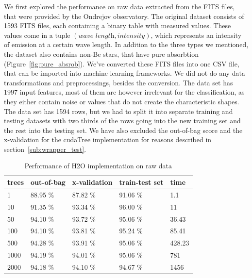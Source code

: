 \documentclass[thesis=B,english]{FITthesis}[2012/10/20]
\begin{document}
We first explored the performance on raw data extracted from the FITS files, that were provided by the Ondrejov observatory. The original dataset consists of 1593 FITS files, each containing a binary table with measured values. These values come in a tuple \((\textit{wave length}, \textit{intensity})\), which represents an intensity of emission at a certain wave length. In addition to the three types we mentioned, the dataset also contains non-Be stars, that have pure absorbtion (Figure~\ref{fig:pure_absrob}). We've converted these FITS files into one CSV file, that can be imported into machine learning frameworks. We did not do any data transformations and preprocessings, besides the conversion. The data set has 1997 input features, most of them are however irrelevant for the classification, as they either contain noise or values that do not create the characteristic shapes. The data set has 1594 rows, but we had to split it into separate training and testing datasets with two thirds of the rows going into the new training set and the rest into the testing set. We have also excluded the out-of-bag score and the x-validation for the cudaTree implementation for reasons described in section~\ref{sub:wrapper_test}.
\begin{table}[h]
\begin{tabular}{|l|l|l|l|l|}
\hline
trees        & out-of-bag & x-validation & train-test set & time \\ \hline
1            &88.95 \%            &87.82 \%              &91.06 \%                 & 1.1        \\ \hline
10           &91.35 \%            &93.34 \%              &96.00 \%                 & 11       \\ \hline
50           &94.10 \%            &93.72 \%              &95.06 \%                 & 36.43      \\ \hline
100          &94.10 \%            &93.81 \%              &95.24 \%                 & 85.41      \\ \hline
500          &94.28 \%            &93.91 \%              &95.06 \%                 & 428.23     \\ \hline
1000         &94.19 \%            &94.01 \%              &95.06 \%                 & 781        \\ \hline
2000         &94.18 \%            &94.10 \%              &94.67 \%                 & 1456       \\ \hline
\end{tabular}
\caption{Performance of H2O implementation on raw data}
\label{tab:h2o-raw}
\end{table}
\end{document}
